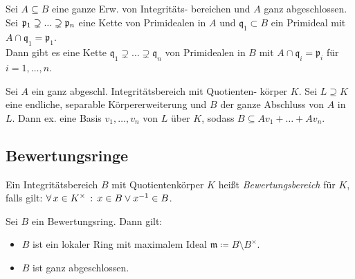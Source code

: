 \documentclass{cheat-sheet}
\newcommand{\ppp}{\mathfrak{p}}
\newcommand{\qqq}{\mathfrak{q}}
\newcommand{\mmm}{\mathfrak{m}}
\begin{document}


\begin{satz}
  Sei $A \subseteq B$ eine ganze Erw. von Integritäts- bereichen und $A$ ganz abgeschlossen.
  Sei $\ppp_1 \supsetneq \nldots \supsetneq \ppp_n$ eine Kette von Primidealen in $A$ und $\qqq_1 \subset B$ ein Primideal mit $A \cap \qqq_1 = \ppp_1$. \\
  Dann gibt es eine Kette $\qqq_1 \supsetneq \ldots \supsetneq \qqq_n$ von Primidealen in $B$ mit $A \cap \qqq_i = \ppp_i$ für $i = 1, \ldots, n$.
\end{satz}

\begin{prop}
  Sei $A$ ein ganz abgeschl. Integritätsbereich mit Quotienten- körper $K$.
  Sei $L \supseteq K$ eine endliche, separable Körpererweiterung und $B$ der ganze Abschluss von $A$ in $L$.
  Dann ex. eine Basis $v_1, \ldots, v_n$ von $L$ über $K$, sodass $B \subseteq A v_1 + \ldots + A v_n$.
\end{prop}


\subsection{Bewertungsringe}


\begin{defn}
  Ein Integritätsbereich $B$ mit Quotientenkörper $K$ heißt \emph{Bewertungsbereich} für $K$, falls gilt: $\forall \, {x \in K^{\times}} \,:\, x \in B \vee x^{-1} \in B$.
\end{defn}

\begin{prop}
  Sei $B$ ein Bewertungsring.
  Dann gilt:
  \begin{itemize}
    \item $B$ ist ein lokaler Ring mit maximalem Ideal $\mmm \coloneqq B \setminus B^{\times}$.
    \item $B$ ist ganz abgeschlossen.
  \end{itemize}
\end{prop}

\end{document}
